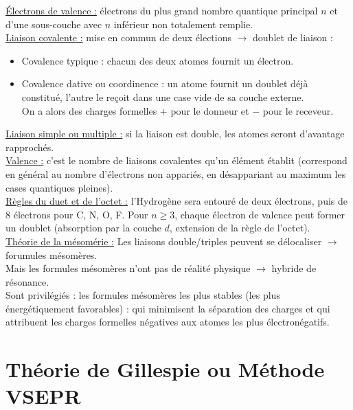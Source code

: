 \documentclass[13pt, twoside, a4paper, french, tikz]{report}
\begin{document}
    \underline{Électrons de valence :} électrons du plus grand nombre quantique principal $n$ et d'une sous-couche avec $n$ inférieur non totalement remplie.\\

    \underline{Liaison covalente :} mise en commun de deux élections $\rightarrow$ doublet de liaison :
    \begin{itemize}
        \item Covalence typique : chacun des deux atomes fournit un électron.
        \item Covalence dative ou coordinence : un atome fournit un doublet déjà constitué, l'autre le reçoit dans une case vide de sa couche externe.\\
        On a alors des charges formelles $+$ pour le donneur et $-$ pour le receveur.\\
    \end{itemize}

    \underline{Liaison simple ou multiple :} si la liaison est double, les atomes seront d'avantage rapprochés.\\

    \underline{Valence :} c'est le nombre de liaisons covalentes qu'un élément établit (correspond en général au nombre d'électrons non appariés, en désappariant au maximum les cases quantiques pleines).\\

    \underline{Règles du duet et de l'octet :} l'Hydrogène sera entouré de deux électrons, puis de 8 électrons pour C, N, O, F.
    Pour $n \ge 3$, chaque électron de valence peut former un doublet (absorption par la couche $d$, extension de la règle de l'octet).\\

    \underline{Théorie de la mésomérie :} Les liaisons double/triples peuvent se délocaliser $\rightarrow$ forumules mésomères.\\
    Mais les formules mésomères n'ont pas de réalité physique $\rightarrow$ hybride de résonance.\\
    Sont privilégiés : les formules mésomères les plus stables (les plus énergétiquement favorables) : qui minimisent la séparation des charges et qui attribuent les charges formelles négatives aux atomes les plus électronégatifs.


    \section{Théorie de Gillespie ou Méthode VSEPR}\label{sec:theorie-de-gillespie-ou-methode-vsepr}
\end{document}
